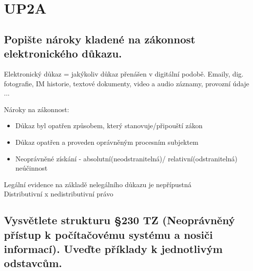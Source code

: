 \section{UP2A}

\subsection{Popište nároky kladené na zákonnost elektronického důkazu.}
Elektronický důkaz = jakýkoliv důkaz přenášen v digitální podobě. Emaily, dig. fotografie, IM historie, textové dokumenty, video a audio záznamy, provozní údaje ...

Nároky na zákonnost:\begin{itemize}
    \item Důkaz byl opatřen způsobem, který stanovuje/připouští zákon
    \item Důkaz opatřen a proveden oprávněným procesním subjektem
    \item Neoprávněné získání - absolutní(neodstranitelná)/ relativní(odstranitelná) neúčinnost
\end{itemize}
Legální evidence na základě nelegálního důkazu je nepřípustná\\
Distributivní x nedistributivní právo

\subsection{Vysvětlete strukturu §230 TZ (Neoprávněný přístup k počítačovému systému a nosiči informací). Uveďte příklady k jednotlivým odstavcům.}

